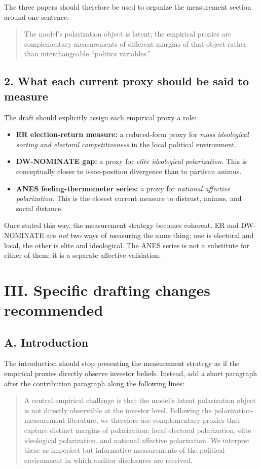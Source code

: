 \documentclass[12pt]{article}
\begin{document}
The three papers should therefore be used to organize the measurement section around one sentence:

\begin{quote}
The model's polarization object is latent; the empirical proxies are complementary measurements of different margins of that object rather than interchangeable ``politics variables.''
\end{quote}

\subsection*{2. What each current proxy should be said to measure}
The draft should explicitly assign each empirical proxy a role:
\begin{itemize}
    \item \textbf{ER election-return measure:} a reduced-form proxy for \emph{mass ideological sorting and electoral competitiveness} in the local political environment.
    \item \textbf{DW-NOMINATE gap:} a proxy for \emph{elite ideological polarization}. This is conceptually closer to issue-position divergence than to partisan animus.
    \item \textbf{ANES feeling-thermometer series:} a proxy for \emph{national affective polarization}. This is the closest current measure to distrust, animus, and social distance.
\end{itemize}

Once stated this way, the measurement strategy becomes coherent. ER and DW-NOMINATE are \emph{not} two ways of measuring the same thing; one is electoral and local, the other is elite and ideological. The ANES series is not a substitute for either of them; it is a separate affective validation.

\section*{III. Specific drafting changes recommended}

\subsection*{A. Introduction}
The introduction should stop presenting the measurement strategy as if the empirical proxies directly observe investor beliefs. Instead, add a short paragraph after the contribution paragraph along the following lines:

\begin{quote}
A central empirical challenge is that the model's latent polarization object is not directly observable at the investor level. Following the polarization-measurement literature, we therefore use complementary proxies that capture distinct margins of polarization: local electoral polarization, elite ideological polarization, and national affective polarization. We interpret these as imperfect but informative measurements of the political environment in which auditor disclosures are received.
\end{quote}
\end{document}

